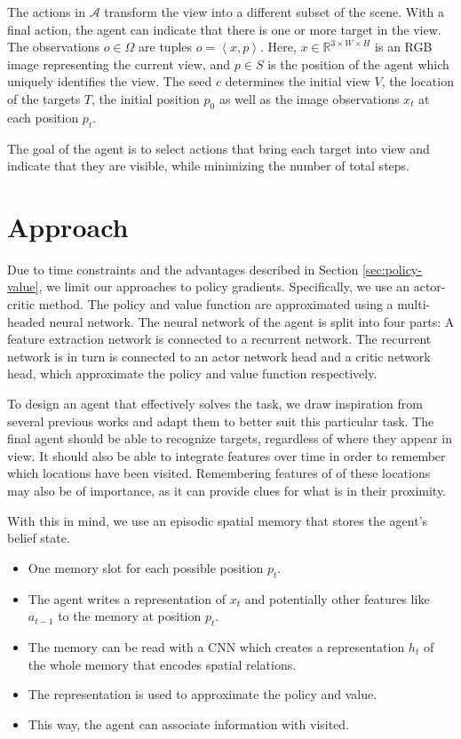The actions in \(\mathcal{A}\) transform the view into a different subset of the scene.
With a final action, the agent can indicate that there is one or more target in the view.
The observations \(o \in \Omega\) are tuples \(o = \left\langle x, p \right\rangle\).
Here, \(x \in \mathbb{R}^{3 \times W \times H}\) is an RGB image representing the current view, and \(p \in S\) is the position of the agent which uniquely identifies the view.
The seed \(c\) determines the initial view \(V\), the location of the targets \(T\), the initial position \(p_0\) as well as the image observations \(x_t\) at each position \(p_t\).

The goal of the agent is to select actions that bring each target into view and indicate that they are visible, while minimizing the number of total steps.


\section{Approach}
\label{sec:approach}

Due to time constraints and the advantages described in Section \ref{sec:policy-value}, we limit our approaches to policy gradients.
Specifically, we use an actor-critic method.
The policy and value function are approximated using a multi-headed neural network.
The neural network of the agent is split into four parts:
A feature extraction network is connected to a recurrent network.
The recurrent network is in turn is connected to an actor network head and a critic network head, which approximate the policy and value function respectively.

To design an agent that effectively solves the task, we draw inspiration from several previous works and adapt them to better suit this particular task.
The final agent should be able to recognize targets, regardless of where they appear in view.
It should also be able to integrate features over time in order to remember which locations have been visited.
Remembering features of of these locations may also be of importance, as it can provide clues for what is in their proximity. 

With this in mind, we use an episodic spatial memory that stores the agent's belief state.

\begin{itemize}
    \item One memory slot for each possible position \(p_t\).
    \item The agent writes a representation of \(x_t\) and potentially other features like \(a_{t-1}\) to the memory at position \(p_t\).
    \item The memory can be read with a CNN which creates a representation \(h_t\) of the whole memory that encodes spatial relations.
    \item The representation is used to approximate the policy and value.
    \item This way, the agent can associate information with visited.
\end{itemize}

